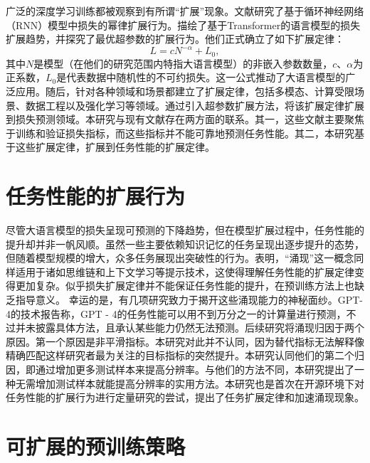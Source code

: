 广泛的深度学习训练都被观察到有所谓“扩展”现象\citep{hestness2017deep, kaplan2020scaling, rae2021scaling, aghajanyan2023scaling}。文献\citet{hestness2017deep}研究了基于循环神经网络（RNN）模型中损失的幂律扩展行为。\citet{kaplan2020scaling}描绘了基于Transformer的语言模型的损失扩展趋势，并探究了最优超参数的扩展行为。他们正式确立了如下扩展定律：
\begin{equation}
\label{eq:loss_scaling_law}
    L = c N^{-\alpha} + L_0,
\end{equation}
其中\(N\)是模型（在他们的研究范围内特指大语言模型）的非嵌入参数数量，\(c\)、\(\alpha\)为正系数，\(L_0\)是代表数据中随机性的不可约损失。这一公式推动了大语言模型的广泛应用。随后，针对各种领域和场景都建立了扩展定律，包括多模态\citep{henighan2020scaling, zhai2022scaling}、计算受限场景\citep{hoffmann2022training}、数据工程\citep{muennighoff2023scaling,sorscher2022beyond}以及强化学习\citep{gao2023scaling}等领域。\citet{yao2023research}通过引入超参数扩展方法，将该扩展定律扩展到损失预测领域。本研究与现有文献存在两方面的联系。其一，这些文献主要聚焦于训练和验证损失指标，而这些指标并不能可靠地预测任务性能。其二，本研究基于这些扩展定律，扩展到任务性能的扩展定律。


\section{任务性能的扩展行为}

尽管大语言模型的损失呈现可预测的下降趋势，但在模型扩展过程中，任务性能的提升却并非一帆风顺。虽然一些主要依赖知识记忆的任务呈现出逐步提升的态势，但随着模型规模的增大，众多任务展现出突破性的行为\citep{srivastava2022beyond,wei2022emergent}。\citet{wei2022emergent}表明，“涌现”这一概念同样适用于诸如思维链\citep{wei2022chain}和上下文学习\citep{brown2020language}等提示技术，这使得理解任务性能的扩展定律变得更加复杂。似乎损失扩展定律并不能保证任务性能的提升，在预训练方法上也缺乏指导意义。
幸运的是，有几项研究致力于揭开这些涌现能力的神秘面纱。GPT-4的技术报告\citep{openai2023gpt4}称，GPT - 4的任务性能可以用不到万分之一的计算量进行预测，不过并未披露具体方法，且承认某些能力仍然无法预测。后续研究\citep{schaeffer2023emergent}将涌现归因于两个原因。第一个原因是非平滑指标。本研究对此并不认同，因为替代指标无法解释像精确匹配这样研究者最为关注的目标指标的突然提升。本研究认同他们的第二个归因，即通过增加更多测试样本来提高分辨率。与他们的方法不同，本研究提出了一种无需增加测试样本就能提高分辨率的实用方法。本研究也是首次在开源环境下对任务性能的扩展行为进行定量研究的尝试，提出了任务扩展定律和加速涌现现象。 

\section{可扩展的预训练策略}

